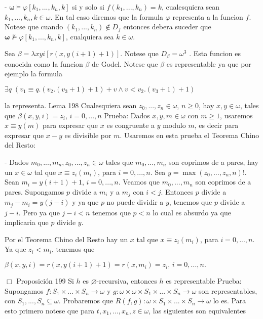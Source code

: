 - \(\mathbf{\omega }\models \varphi \left[ k_{1},...,k_{n},k\right] \) si y solo si \(f(k_{1},...,k_{n})=k\), cualesquiera sean \(k_{1},...,k_{n},k\in \omega .\)
En tal caso diremos que la formula \(\varphi \) representa a la funcion \(f\). Notese que cuando \((k_{1},...,k_{n})\notin D_{f}\) entonces debera suceder que \(\mathbf{\omega }\nvDash \varphi \left[ k_{1},...,k_{n},k \right] \), cualquiera sea \(k\in \omega \).

Sea \(\beta =\lambda xyi[r(x,y(i+1)+1)]\). Notese que \(D_{\beta }=\omega ^{3}\) . Esta funcion es conocida como la funcion \(\beta \) de Godel. Notese que \(\beta \) es representable ya que por ejemplo la formula

\(\displaystyle \exists q\;(v_{1}\equiv q.(v_{2}.(v_{3}+1)+1)+v\wedge v< v_{2}.(v_{3}+1)+1) \)

la representa.
Lema 198 Cualesquiera sean \(z_{0},...,z_{n}\in \omega \), \(n\geq 0\), hay \(x,y\in \omega \), tales que \(\beta (x,y,i)=z_{i}\), \(i=0,...,n\)
Prueba: Dados \(x,y,m\in \omega \) con \(m\geq 1\), usaremos \(x\equiv y(m)\) para expresar que \(x\) es congruente a \(y\) modulo \(m\), es decir para expresar que \( x-y\) es divisible por \(m\). Usaremos en esta prueba el Teorema Chino del Resto:

- Dados \(m_{0},...,m_{n},z_{0},...,z_{n}\in \omega \) tales que \( m_{0},...,m_{n}\) son coprimos de a pares, hay un \(x\in \omega \) tal que \( x\equiv z_{i}(m_{i})\), para \(i=0,...,n.\)
Sea \(y=\max (z_{0},...,z_{n},n)!\). Sean \(m_{i}=y(i+1)+1\), \(i=0,...,n\). Veamos que \(m_{0},...,m_{n}\) son coprimos de a pares. Supongamos \(p\) divide a \(m_{i}\) y a \(m_{j}\) con \(i< j\). Entonces \(p\) divide a \(m_{j}-m_{i}=y(j-i)\) y ya que \(p\) no puede dividir a \(y\), tenemos que \(p\) divide a \(j-i\). Pero ya que \(j-i< n\) tenemos que \(p< n\) lo cual es absurdo ya que implicaria que \(p\) divide \(y\).

Por el Teorema Chino del Resto hay un \(x\) tal que \(x\equiv z_{i}(m_{i})\), para \(i=0,...,n\). Ya que \(z_{i}< m_{i}\), tenemos que

\(\displaystyle \beta (x,y,i)=r(x,y(i+1)+1)=r(x,m_{i})=z_{i}\text{, }i=0,...,n\text{.} \)

\(\Box\)
Proposición 199 Si \(h\) es \(\varnothing \)-recursiva, entonces \(h\) es representable
Prueba: Supongamos \(f:S_{1}\times ...\times S_{n}\rightarrow \omega \) y \(g:\omega \times \omega \times S_{1}\times ...\times S_{n}\rightarrow \omega \) son representables, con \(S_{1},...,S_{n}\subseteq \omega \). Probaremos que \( R(f,g):\omega \times S_{1}\times ...\times S_{n}\rightarrow \omega \) lo es. Para esto primero notese que para \(t,x_{1},...,x_{n},z\in \omega \), las siguientes son equivalentes

